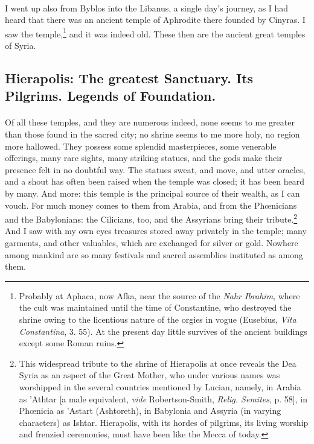 \documentclass[a4paper, 11pt, oneside, polutonikogreek, english]{article}
\begin{document}
\paragraph{}
I went up also from Byblos into the Libanus, a single day's journey, as I had heard that there was an ancient temple of Aphrodite there founded by Cinyras. I saw the temple,\footnote{Probably at Aphaca, now Afka, near the source of the \emph{Nahr Ibrahim}, where the cult was maintained until the time of Constantine, who destroyed the shrine owing to the licentious nature of the orgies in vogue (Eusebius, \emph{Vita Constantina}, 3. 55). At the present day little survives of the ancient buildings except some Roman ruins.} and it was indeed old. These then are the ancient great temples of Syria.

\subsection{Hierapolis: The greatest Sanctuary. Its Pilgrims. Legends of Foundation.}
\paragraph{}
Of all these temples, and they are numerous indeed, none seems to me greater than those found in the sacred city; no shrine seems to me more holy, no region more hallowed. They possess some splendid masterpieces, some venerable offerings, many rare sights, many striking statues, and the gods make their presence felt in no doubtful way. The statues sweat, and move, and utter oracles, and a shout has often been raised when the temple was closed; it has been heard by many. And more: this temple is the principal source of their wealth, as I can vouch. For much money comes to them from Arabia, and from the Phœnicians and the Babylonians: the Cilicians, too, and the Assyrians bring their tribute.\footnote{This widespread tribute to the shrine of Hierapolis at once reveals the Dea Syria as an aspect of the Great Mother, who under various names was worshipped in the several countries mentioned by Lucian, namely, in Arabia as 'Athtar [a male equivalent, \emph{vide} Robertson-Smith, \emph{Relig. Semites}, p. 58], in Phœnicia as 'Astart (Ashtoreth), in Babylonia and Assyria (in varying characters) as Ishtar. Hierapolis, with its hordes of pilgrims, its living worship and frenzied ceremonies, must have been like the Mecca of today.} And I saw with my own eyes treasures stored away privately in the temple; many garments, and other valuables, which are exchanged for silver or gold. Nowhere among mankind are so many festivals and sacred assemblies instituted as among them.
\end{document}
